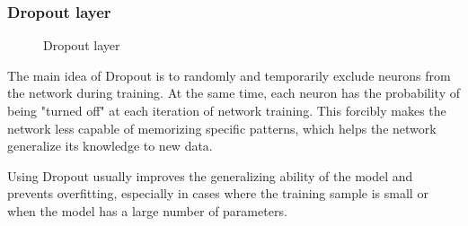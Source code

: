 \subsubsection{Dropout layer}
\begin{figure}[h]
    \begin{center}
    \end{center}
    \caption{Dropout layer}\label{dropout_layer}
\end{figure}
The main idea of Dropout is to randomly and temporarily exclude neurons from the network during training. At the same time, 
each neuron has the probability of being "turned off" at each iteration of network training. This forcibly makes the network 
less capable of memorizing specific patterns, which helps the network generalize its knowledge to new data.

Using Dropout usually improves the generalizing ability of the model and prevents overfitting, especially in cases where the 
training sample is small or when the model has a large number of parameters.

